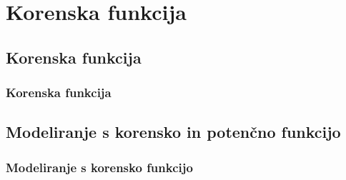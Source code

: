 \section{Korenska funkcija}

\begin{frame}
    \sectionpage
\end{frame}

\begin{frame}
\end{frame}

    \subsection{Korenska funkcija}

        \begin{frame}
            \frametitle{Korenska funkcija}
        \end{frame}

    \subsection{Modeliranje s korensko in potenčno funkcijo}

        \begin{frame}
            \frametitle{Modeliranje s korensko funkcijo}
        \end{frame}
